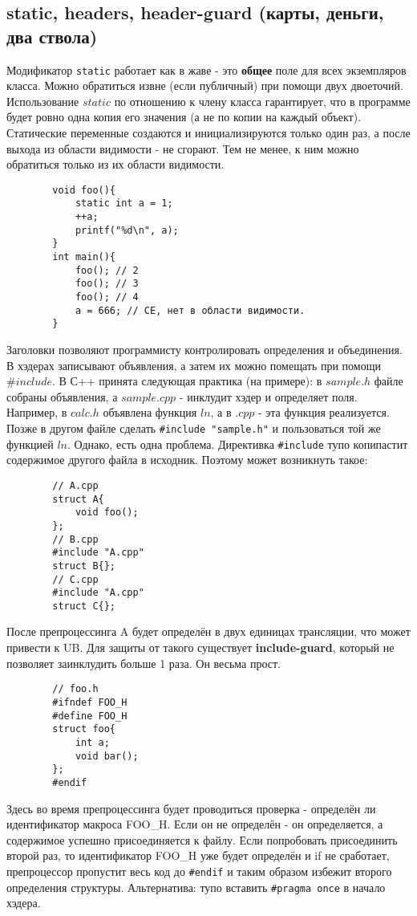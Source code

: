 \documentclass[15pt, a4paper]{article}
\newcommand{\nl}{\newline}
\begin{document}
    \subsection{static, headers, header-guard (карты, деньги, два ствола)}
    Модификатор \texttt{static} работает как в жаве - это \textbf{общее} поле для всех экземпляров класса. Можно обратиться извне (если публичный) при помощи двух двоеточий.
    Использование $static$ по отношению к члену класса гарантирует, что в программе будет ровно одна копия его значения (а не по копии на каждый объект).
    Статические переменные создаются и инициализируются только один раз, а после выхода из области видимости - не сгорают. Тем не менее, к ним можно обратиться только из их области видимости.
    \begin{verbatim}
        void foo(){
            static int a = 1;
            ++a;
            printf("%d\n", a);
        }
        int main(){
            foo(); // 2
            foo(); // 3
            foo(); // 4
            a = 666; // CE, нет в области видимости.
        }
    \end{verbatim}
    Заголовки позволяют программисту контролировать определения и объединения. В хэдерах записывают объявления, а затем их можно помещать при помощи $\# include$.
    В С++ принята следующая практика (на примере): в $sample.h$ файле собраны объявления, а $sample.cpp$ - инклудит хэдер и определяет поля. Например, в $calc.h$ объявлена
    функция $ln$, а в $.cpp$ - эта функция реализуется. Позже в другом файле сделать \texttt{\#include "sample.h"} и пользоваться той же функцией $ln$. \nl 
    Однако, есть одна проблема. Директивка \texttt{\#include} тупо копипастит содержимое другого файла в исходник. Поэтому может возникнуть такое:
    \begin{verbatim}
        // A.cpp
        struct A{
            void foo();
        };
        // B.cpp
        #include "A.cpp"
        struct B{};
        // C.cpp
        #include "A.cpp"
        struct C{};
    \end{verbatim}
    После препроцессинга A будет определён в двух единицах трансляции, что может привести к UB. Для защиты от такого существует \textbf{include-guard}, который не позволяет заинклудить больше 1 раза. Он весьма прост.
    \begin{verbatim}
        // foo.h
        #ifndef FOO_H
        #define FOO_H
        struct foo{
            int a;
            void bar();
        };
        #endif
    \end{verbatim}
    Здесь во время препроцессинга будет проводиться проверка - определён ли идентификатор макроса FOO\_H. Если он не определён - он определяется, а содержимое
    успешно присоединяется к файлу. Если попробовать присоединить второй раз, то идентификатор FOO\_H уже будет определён и if не сработает, препроцессор пропустит весь код до \texttt{\#endif}
    и таким образом избежит второго определения структуры. \nl
    Альтернатива: тупо вставить \texttt{\#pragma once} в начало хэдера.
\end{document}
